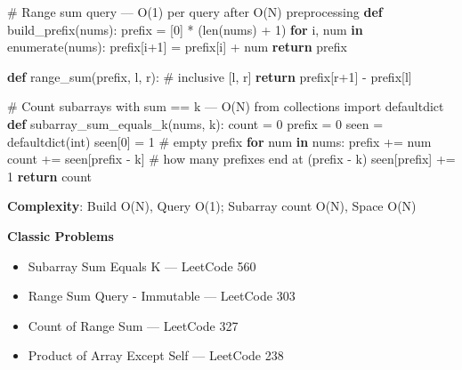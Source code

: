 \documentclass[11pt]{article}
\providecommand{\tightlist}{\setlength{\itemsep}{1pt}\setlength{\parskip}{0pt}}
\newenvironment{Shaded}{\begin{snugshade}}{\end{snugshade}}
\newcommand{\BuiltInTok}[1]{\textcolor[rgb]{0.50,0.55,0.55}{#1}}
\newcommand{\CommentTok}[1]{\textcolor[rgb]{0.48,0.49,0.49}{#1}}
\newcommand{\ControlFlowTok}[1]{\textcolor[rgb]{0.99,0.74,0.29}{\textbf{#1}}}
\newcommand{\DecValTok}[1]{\textcolor[rgb]{0.96,0.45,0.00}{#1}}
\newcommand{\ImportTok}[1]{\textcolor[rgb]{0.15,0.68,0.38}{#1}}
\newcommand{\KeywordTok}[1]{\textcolor[rgb]{0.81,0.81,0.76}{\textbf{#1}}}
\newcommand{\NormalTok}[1]{\textcolor[rgb]{0.81,0.81,0.76}{#1}}
\newcommand{\OperatorTok}[1]{\textcolor[rgb]{0.81,0.81,0.76}{#1}}
\begin{document}
\begin{Shaded}
\begin{Highlighting}[]
\CommentTok{\# Range sum query — O(1) per query after O(N) preprocessing}
\KeywordTok{def}\NormalTok{ build\_prefix(nums):}
\NormalTok{    prefix }\OperatorTok{=}\NormalTok{ [}\DecValTok{0}\NormalTok{] }\OperatorTok{*}\NormalTok{ (}\BuiltInTok{len}\NormalTok{(nums) }\OperatorTok{+} \DecValTok{1}\NormalTok{)}
    \ControlFlowTok{for}\NormalTok{ i, num }\KeywordTok{in} \BuiltInTok{enumerate}\NormalTok{(nums):}
\NormalTok{        prefix[i}\OperatorTok{+}\DecValTok{1}\NormalTok{] }\OperatorTok{=}\NormalTok{ prefix[i] }\OperatorTok{+}\NormalTok{ num}
    \ControlFlowTok{return}\NormalTok{ prefix}

\KeywordTok{def}\NormalTok{ range\_sum(prefix, l, r):           }\CommentTok{\# inclusive [l, r]}
    \ControlFlowTok{return}\NormalTok{ prefix[r}\OperatorTok{+}\DecValTok{1}\NormalTok{] }\OperatorTok{{-}}\NormalTok{ prefix[l]}

\CommentTok{\# Count subarrays with sum == k — O(N)}
\ImportTok{from}\NormalTok{ collections }\ImportTok{import}\NormalTok{ defaultdict}
\KeywordTok{def}\NormalTok{ subarray\_sum\_equals\_k(nums, k):}
\NormalTok{    count }\OperatorTok{=} \DecValTok{0}
\NormalTok{    prefix }\OperatorTok{=} \DecValTok{0}
\NormalTok{    seen }\OperatorTok{=}\NormalTok{ defaultdict(}\BuiltInTok{int}\NormalTok{)}
\NormalTok{    seen[}\DecValTok{0}\NormalTok{] }\OperatorTok{=} \DecValTok{1}                        \CommentTok{\# empty prefix}
    \ControlFlowTok{for}\NormalTok{ num }\KeywordTok{in}\NormalTok{ nums:}
\NormalTok{        prefix }\OperatorTok{+=}\NormalTok{ num}
\NormalTok{        count }\OperatorTok{+=}\NormalTok{ seen[prefix }\OperatorTok{{-}}\NormalTok{ k]      }\CommentTok{\# how many prefixes end at (prefix {-} k)}
\NormalTok{        seen[prefix] }\OperatorTok{+=} \DecValTok{1}
    \ControlFlowTok{return}\NormalTok{ count}
\end{Highlighting}
\end{Shaded}

\textbf{Complexity}: Build O(N), Query O(1); Subarray count O(N), Space O(N)

\textbf{Classic Problems}

\begin{itemize}
\tightlist
\item
  Subarray Sum Equals K --- LeetCode 560
\item
  Range Sum Query - Immutable --- LeetCode 303
\item
  Count of Range Sum --- LeetCode 327
\item
  Product of Array Except Self --- LeetCode 238
\end{itemize}
\end{document}
